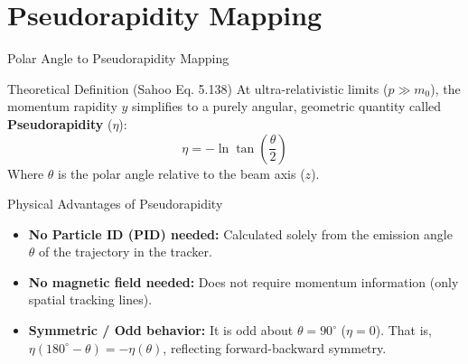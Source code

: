 \documentclass[aspectratio=169]{beamer}
\begin{document}
\section{Pseudorapidity Mapping}

\begin{frame}{Polar Angle to Pseudorapidity Mapping}
    \begin{block}{Theoretical Definition (Sahoo Eq. 5.138)}
        \small
        At ultra-relativistic limits ($p \gg m_0$), the momentum rapidity $y$ simplifies to a purely angular, geometric quantity called \textbf{Pseudorapidity} ($\eta$):
        \[ \eta = -\ln \tan \left( \frac{\theta}{2} \right) \]
        Where $\theta$ is the polar angle relative to the beam axis ($z$).
    \end{block}
    \begin{block}{Physical Advantages of Pseudorapidity}
        \footnotesize
        \begin{itemize}
            \item \textbf{No Particle ID (PID) needed:} Calculated solely from the emission angle $\theta$ of the trajectory in the tracker.
            \item \textbf{No magnetic field needed:} Does not require momentum information (only spatial tracking lines).
            \item \textbf{Symmetric / Odd behavior:} It is odd about $\theta = 90^\circ$ ($\eta=0$). That is, $\eta(180^\circ - \theta) = -\eta(\theta)$, reflecting forward-backward symmetry.
        \end{itemize}
    \end{block}
\end{frame}
\end{document}
